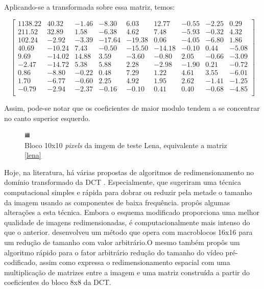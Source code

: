 \noindent Aplicando-se a transformada sobre essa matriz, temos:


\begin{center}
	\begin{equation}
\begin{bmatrix}
1138.22&	40.32&	-1.46&	-8.30&	6.03&	12.77&	-0.55&	-2.25&	0.29\\
211.52&	32.89&	1.58&	-6.38&	4.62&	7.48&	-5.93&	-0.32&	4.32\\
102.24&	-2.92&	-3.39&	-17.64&	-19.38&	0.06&	-4.05&	-6.80&	1.86\\	
40.69&	-10.24&	7.43&	-0.50&	-15.50&	-14.18&	-0.10&	0.44&	-5.08\\	
9.69&	-14.02&	14.88&	3.59&	-3.60&	-0.80&	2.05&	-0.66&	-3.09\\
-2.47&	-14.72&	5.38&	5.88&	2.28&	-2.98&	-1.90&	0.21&	-0.72\\
0.86&	-8.80&	-0.22&	0.48&	7.29&	1.22&	4.61&	3.55&	-6.01\\
1.70&	-6.77&	-0.60&	2.25&	4.92&	1.95&	2.62&	-1.41&	-1.25\\
-0.79&	-2.94&	-2.37&	-0.16&	-0.10&	0.41&	0.40&	-0.68&	-4.85\\
\end{bmatrix}	
	\end{equation}
\end{center}

\noindent Assim, pode-se notar que os coeficientes de maior modulo tendem a se concentrar no canto superior esquerdo. 

\begin{figure}[h]
	\centering
	\includegraphics[scale=4]{figuras/BLOCO.png}
	\caption{Bloco 10x10 \textit{pixels} da imgem de teste Lena, equivalente a matriz \ref{lena}}
	\label{PEDACO_LENA}
\end{figure}

Hoje, na literatura, há várias propostas de algoritmos de redimensionamento no domínio transformado da DCT \cite{patil2006fast2,chang1995manipulation,wang2010adaptive} . Especialmente,  que sugeriram uma técnica computacional simples e rápida para dobrar ou reduzir pela metade o tamanho da imagem usando as componentes de baixa frequência.  propôs algumas alterações a esta técnica. Embora o esquema modificado proporciona uma melhor qualidade de imagens redimensionadas, é computacionalmente mais intenso do que o anterior.  desenvolveu um método que opera com macroblocos 16x16 para um redução de tamanho com valor arbitrário.O mesmo também propôs  um algoritmo rápido para o fator arbitrário redução do tamanho do vídeo pré-codificado, assim como expressa o redimensionamento espacial com uma multiplicação de matrizes entre a imagem e uma matriz construída a partir do coeficientes do bloco 8x8 da DCT.

